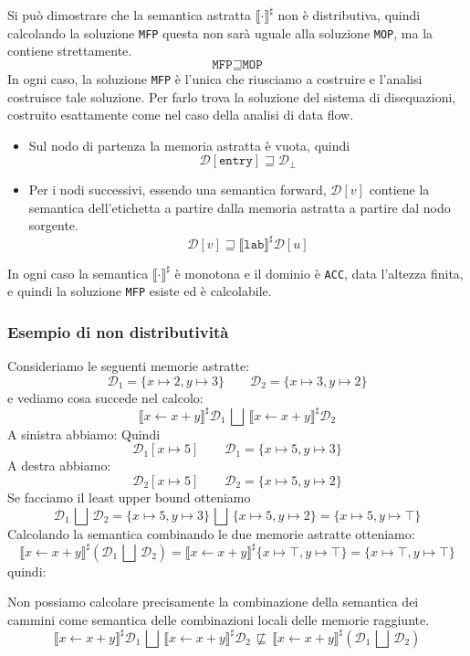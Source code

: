 Si può dimostrare che la semantica astratta $\llbracket \cdot \rrbracket^\sharp$ non 
è distributiva, quindi calcolando la soluzione \texttt{MFP} questa non sarà uguale 
alla soluzione \texttt{MOP}, ma la contiene strettamente.
\[
  \texttt{MFP} \sqsupseteq \texttt{MOP}  
\]
In ogni caso, la soluzione \texttt{MFP} è l'unica che riusciamo a costruire e l'analisi 
costruisce tale soluzione. 
Per farlo trova la soluzione del sistema di disequazioni, costruito esattamente come nel 
caso della analisi di data flow.
\begin{itemize}
    \item Sul nodo di partenza la memoria astratta è vuota, quindi
    \[
        \mathcal{D}[\texttt{entry}] \sqsupseteq \mathcal{D}_\bot 
    \]
    \item Per i nodi successivi, essendo una semantica forward, $\mathcal{D}[v]$ contiene 
    la semantica dell'etichetta a partire dalla memoria astratta a 
    partire dal nodo sorgente.
    \[
        \mathcal{D}[v] \sqsupseteq \llbracket \texttt{lab} \rrbracket^\sharp \mathcal{D}[u]
    \]
\end{itemize}
In ogni caso la semantica $\llbracket \cdot \rrbracket^\sharp$ è monotona e il 
dominio è \texttt{ACC}, data l'altezza finita, e quindi la soluzione \texttt{MFP} 
esiste ed è calcolabile.
\subsubsection{Esempio di non distributività}
Consideriamo le seguenti memorie astratte:
\[
    \mathcal{D}_1 = \{ x \mapsto 2, y \mapsto 3 \} \qquad
    \mathcal{D}_2 = \{ x \mapsto 3, y \mapsto 2 \}
\]
e vediamo cosa succede nel calcolo:
\[
    \llbracket x \gets x + y \rrbracket^\sharp \mathcal{D}_1 
    \,\bigsqcup\, 
    \llbracket x \gets x + y \rrbracket^\sharp \mathcal{D}_2
\]
A sinistra abbiamo:
Quindi 
\[
    \mathcal{D}_1 [x \mapsto 5] \qquad \mathcal{D}_1 = \{ x \mapsto 5, y \mapsto 3 \}
\]
A destra abbiamo:
\[
    \mathcal{D}_2 [x \mapsto 5] \qquad \mathcal{D}_2 = \{ x \mapsto 5, y \mapsto 2 \}
\]
Se facciamo il least upper bound otteniamo 
\[
    \mathcal{D}_1 \,\bigsqcup\, \mathcal{D}_2 = 
    \{ x \mapsto 5, y \mapsto 3 \} \,\bigsqcup\, \{ x \mapsto 5, y \mapsto 2 \} = 
    \{ x \mapsto 5, y \mapsto \top \}
\]
Calcolando la semantica combinando le due memorie astratte otteniamo:
\[
    \llbracket x \gets x + y \rrbracket^\sharp (\mathcal{D}_1 \,\bigsqcup\, \mathcal{D}_2) = 
    \llbracket x \gets x + y \rrbracket^\sharp \{ x \mapsto \top, y \mapsto \top \} =
    \{ x \mapsto \top, y \mapsto \top \}
\]
quindi:
\begin{tcolorbox}[title = Non distributività della semantica]
    Non possiamo calcolare precisamente la combinazione della semantica dei cammini
    come semantica delle combinazioni locali delle memorie raggiunte.
    \[
        \llbracket x \gets x + y \rrbracket^\sharp \mathcal{D}_1
        \,\bigsqcup\,
        \llbracket x \gets x + y \rrbracket^\sharp \mathcal{D}_2
        \,\not \sqsubseteq\,
        \llbracket x \gets x + y \rrbracket^\sharp (\mathcal{D}_1 \,\bigsqcup\, \mathcal{D}_2)
    \]
\end{tcolorbox}
